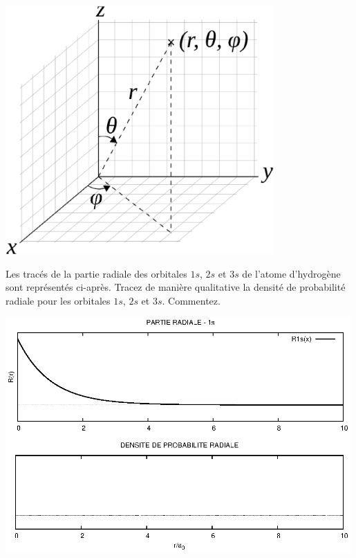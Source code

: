 
\begin{center}
\includegraphics[height=9.5cm]{figure/spheriques_ok.eps}\\
\end{center}

Les trac\'es de la partie radiale des orbitales $1s$, $2s$ et $3s$ de l'atome d'hydrog\`ene 
sont repr\'esent\'es ci-apr\`es.
Tracez de mani\`ere qualitative la densit\'e de probabilit\'e radiale pour les orbitales
$1s$, $2s$ et $3s$. Commentez.
\newpage

\begin{center}
\includegraphics[angle=90,width=0.99\textwidth]{figure/rad1s.eps}
\end{center}

